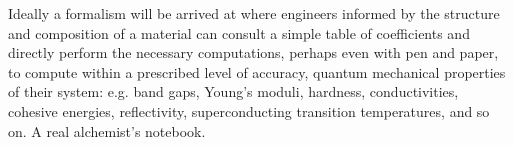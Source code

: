 
Ideally a formalism will be arrived at where engineers informed by the 
structure and composition of a material can consult a simple table of 
coefficients and directly perform the necessary computations, 
perhaps even with pen and paper, to compute within a prescribed
level of accuracy, quantum mechanical properties of their system: e.g. 
band gaps, Young's moduli, hardness, conductivities, cohesive energies, 
reflectivity, superconducting transition temperatures, and so on. A real
alchemist's notebook.
